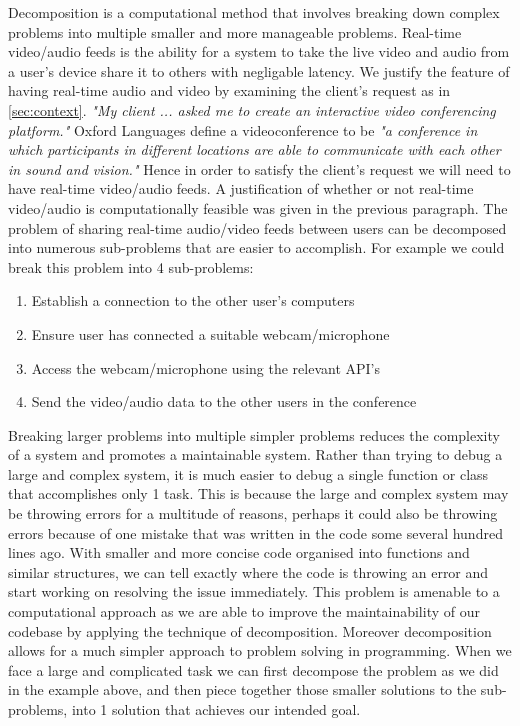 Decomposition is a computational method that involves breaking
down complex problems into multiple smaller and more 
manageable problems. Real-time video/audio feeds is the ability
for a system to take the live video and audio from a user's 
device share it to others with negligable latency. We justify
the feature of having real-time audio and video by examining 
the client's request as in \ref{sec:context}. \textit{"My 
client ... asked me to create an interactive video conferencing
platform."} Oxford Languages define a videoconference to be 
\textit{"a conference in which participants in different 
locations are able to communicate with each other in sound and
vision."} Hence in order to satisfy the client's request we 
will need to have real-time video/audio feeds. A justification
of whether or not real-time video/audio is computationally 
feasible was given in the previous paragraph.
The problem of sharing real-time audio/video feeds between
users can be decomposed into numerous sub-problems that are
easier to accomplish. For example we could break this problem
into 4 sub-problems:

\begin{enumerate}
  \item Establish a connection to the other user's computers 
  \item Ensure user has connected a suitable webcam/microphone
  \item Access the webcam/microphone using the relevant API's
  \item{Send the video/audio data to the other users in the 
        conference}
\end{enumerate}

Breaking larger problems into multiple simpler problems 
reduces the complexity of a system and promotes a  
maintainable system. Rather than trying to debug a large and
complex system, it is much easier to debug a single function 
or class
that accomplishes only 1 task. This is because the large and 
complex system may be throwing errors for a multitude of 
reasons, perhaps it could also be throwing errors because of
one mistake that was written in the code some several hundred
lines ago. With smaller and more concise code organised into
functions and similar structures, we can tell exactly where the
code is throwing an error and start working on resolving the 
issue immediately. This problem is amenable to a computational 
approach as we are able to improve the maintainability of our
codebase by applying the technique of decomposition. Moreover
decomposition allows for a much simpler approach to problem 
solving in programming. When we face a large and complicated 
task we can first decompose the problem as we did in the 
example above, and then piece together those smaller solutions
to the sub-problems, into 1 solution that achieves our intended
goal. \vspace{0.2cm}

